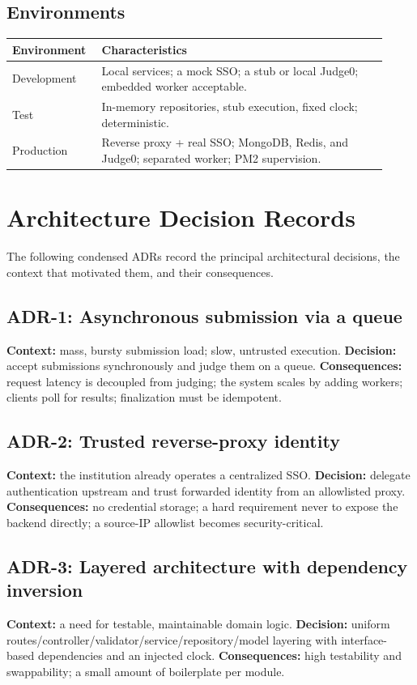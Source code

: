 \documentclass[12pt,a4paper,oneside]{report}
\begin{document}
\section{Environments}
\begin{longtable}{@{}p{0.20\linewidth} p{0.72\linewidth}@{}}
\toprule
\textbf{Environment} & \textbf{Characteristics}\\
\midrule
\endhead
Development & Local services; a mock SSO; a stub or local Judge0; embedded worker acceptable.\\
Test & In-memory repositories, stub execution, fixed clock; deterministic.\\
Production & Reverse proxy + real SSO; MongoDB, Redis, and Judge0; separated worker; PM2 supervision.\\
\bottomrule
\end{longtable}

\chapter{Architecture Decision Records}
The following condensed ADRs record the principal architectural decisions, the
context that motivated them, and their consequences.

\section{ADR-1: Asynchronous submission via a queue}
\textbf{Context:} mass, bursty submission load; slow, untrusted execution.
\textbf{Decision:} accept submissions synchronously and judge them on a queue.
\textbf{Consequences:} request latency is decoupled from judging; the system
scales by adding workers; clients poll for results; finalization must be
idempotent.

\section{ADR-2: Trusted reverse-proxy identity}
\textbf{Context:} the institution already operates a centralized SSO.
\textbf{Decision:} delegate authentication upstream and trust forwarded identity
from an allowlisted proxy. \textbf{Consequences:} no credential storage; a hard
requirement never to expose the backend directly; a source-IP allowlist becomes
security-critical.

\section{ADR-3: Layered architecture with dependency inversion}
\textbf{Context:} a need for testable, maintainable domain logic.
\textbf{Decision:} uniform routes/controller/validator/service/repository/model
layering with interface-based dependencies and an injected clock.
\textbf{Consequences:} high testability and swappability; a small amount of
boilerplate per module.
\end{document}
